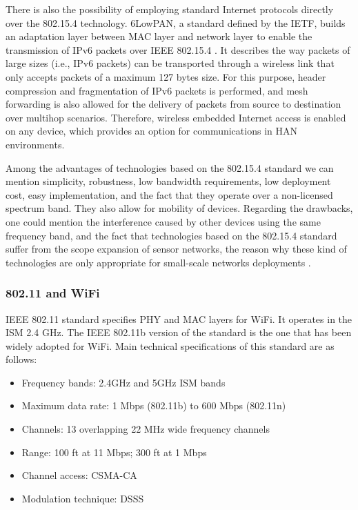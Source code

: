 \documentclass[10pt,twocolumn,twoside,submit]{JCNtran}
\begin{document}
There is also the possibility of employing standard Internet protocols directly over the 802.15.4 technology. 6LowPAN, a standard defined by the IETF, builds an adaptation layer between MAC layer and network layer to enable the transmission of IPv6 packets over IEEE 802.15.4 \cite{RFC 4944}.  It describes the way packets of large sizes (i.e., IPv6 packets) can be transported through a wireless link that only accepts packets of a maximum 127 bytes size. For this purpose, header compression and fragmentation of IPv6 packets is performed, and mesh forwarding is also allowed for the delivery of packets from source to destination over multihop scenarios. Therefore, wireless embedded Internet access is enabled on any device, which provides an option for communications in HAN environments.
 
Among the advantages of technologies based on the 802.15.4 standard we can mention simplicity, robustness, low bandwidth requirements, low deployment cost, easy implementation, and the fact that they operate over a non-licensed spectrum band. They also allow for mobility of  devices. Regarding the drawbacks, one could mention the interference caused by other devices using the same frequency band, and the fact that technologies based on the 802.15.4 standard suffer from the scope expansion of sensor networks, the reason why these kind of technologies are only appropriate for small-scale networks deployments  \cite{Lu2011}.
 
 
%

\subsubsection{802.11 and WiFi}\label{tech::wifi}

IEEE 802.11 standard \cite{Cali80211} specifies PHY and MAC layers for WiFi. It operates in the ISM 2.4 GHz. The IEEE 802.11b version of the standard is the one that has been widely adopted for WiFi. Main technical specifications of this standard are as follows:

\begin{itemize}
	\item Frequency bands: 2.4GHz and 5GHz ISM bands
	\item Maximum data rate: 1 Mbps (802.11b) to 600 Mbps (802.11n)
	\item Channels: 13 overlapping 22 MHz wide frequency channels
	\item Range: 100 ft at 11 Mbps; 300 ft at 1 Mbps
	\item Channel access: CSMA-CA
	\item Modulation technique: DSSS
\end{itemize}  
\end{document}
